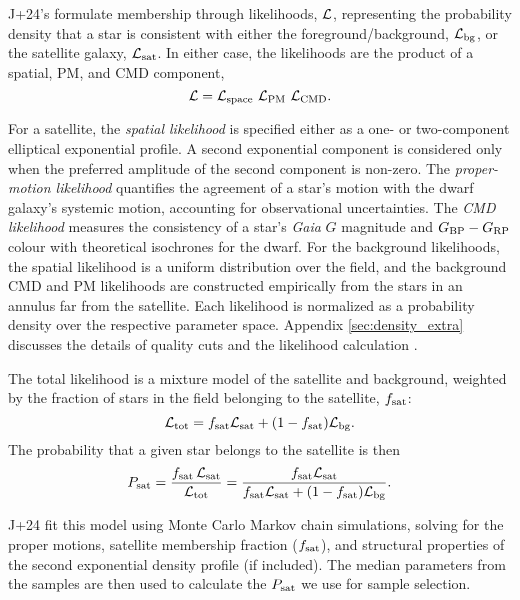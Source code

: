 J+24's formulate membership through likelihoods, \({\cal L}\),
representing the probability density that a star is consistent with
either the foreground/background, \({\cal L}_{\rm bg}\), or the
satellite galaxy, \({\cal L}_{\rm sat}\). In either case, the
likelihoods are the product of a spatial, PM, and CMD component,
\begin{equation}{
{\cal L} = {\cal L}_{\rm space}\ {\cal L}_{\rm PM}\ {\cal L}_{\rm CMD}.
}\end{equation}

For a satellite, the \emph{spatial likelihood} is specified either as a
one- or two-component elliptical exponential profile. A second
exponential component is considered only when the preferred amplitude of
the second component is non-zero. The \emph{proper-motion likelihood}
quantifies the agreement of a star's motion with the dwarf galaxy's
systemic motion, accounting for observational uncertainties. The
\emph{CMD likelihood} measures the consistency of a star's \emph{Gaia}
\(G\) magnitude and \(G_{\rm BP}- G_{\rm RP}\) colour with theoretical
isochrones for the dwarf. For the background likelihoods, the spatial
likelihood is a uniform distribution over the field, and the background
CMD and PM likelihoods are constructed empirically from the stars in an
annulus far from the satellite. Each likelihood is normalized as a
probability density over the respective parameter space. Appendix
\ref{sec:density_extra} discusses the details of quality cuts and the
likelihood calculation \citep[see also,][]{MV2020a, jensen+2024}.

The total likelihood is a mixture model of the satellite and background,
weighted by the fraction of stars in the field belonging to the
satellite, \(f_{\rm sat}\): \begin{equation}{
{\cal L}_{\rm tot} = f_{\rm sat}{\cal L}_{\rm sat} + (1-f_{\rm sat}){\cal L}_{\rm bg}.
}\end{equation} The probability that a given star belongs to the
satellite is then \begin{equation}{
P_{\rm sat} = 
\frac{f_{\rm sat}\,{\cal L}_{\rm sat}}{{\cal L}_{\rm tot}}
= \frac{f_{\rm sat}{\cal L}_{\rm sat}}{f_{\rm sat}{\cal L}_{\rm sat} + (1-f_{\rm sat}){\cal L}_{\rm bg}}.
}\end{equation}

J+24 fit this model using Monte Carlo Markov chain simulations, solving
for the proper motions, satellite membership fraction (\(f_{\rm sat}\)),
and structural properties of the second exponential density profile (if
included). The median parameters from the samples are then used to
calculate the \(P_{\rm sat}\) we use for sample selection.


